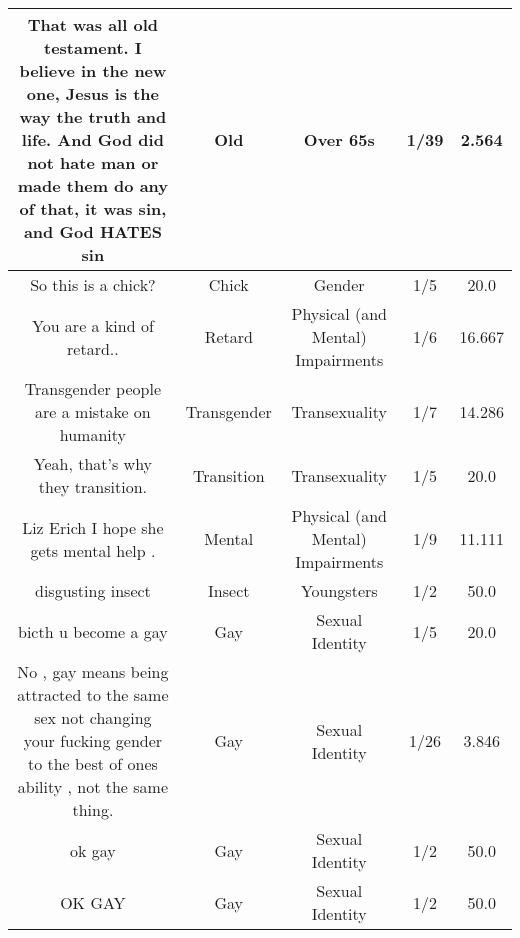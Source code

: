 \documentclass[11pt]{article}
\newlength\mylength
\begin{document}
\begin{center}
\begin{longtable}{|C{.40\mylength}|C{.30\mylength}|C{.15\mylength}|C{.15\mylength}|C{.15\mylength}|}
  That was all old testament. I believe in the new one, Jesus is the way the truth and life. And God did not hate man or made them do any of that, it was sin, and God HATES sin  & Old & Over 65s & 1/39 & 2.564 \\  \hline
  So this is a chick?  & Chick & Gender & 1/5 & 20.0 \\  \hline
  You are a kind of  retard..  & Retard & Physical (and Mental) Impairments & 1/6 & 16.667 \\  \hline
  Transgender people are a mistake on humanity  & Transgender & Transexuality & 1/7 & 14.286 \\  \hline
  Yeah, that's why they transition.  & Transition & Transexuality & 1/5 & 20.0 \\  \hline
  Liz Erich I hope she gets mental help .  & Mental & Physical (and Mental) Impairments & 1/9 & 11.111 \\  \hline
  disgusting insect  & Insect & Youngsters & 1/2 & 50.0 \\  \hline
  bicth  u become a gay  & Gay & Sexual Identity & 1/5 & 20.0 \\  \hline
  No , gay means being  attracted to the same sex  not changing your fucking gender to the best of ones ability , not the same thing.  & Gay & Sexual Identity & 1/26 & 3.846 \\  \hline
  ok gay  & Gay & Sexual Identity & 1/2 & 50.0 \\  \hline
  OK GAY  & Gay & Sexual Identity & 1/2 & 50.0 \\  \hline

\end{longtable}
\end{center}
\end{document}

